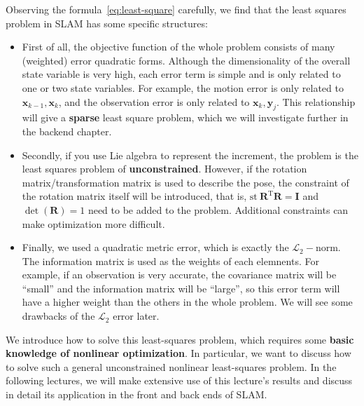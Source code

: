 Observing the formula~\eqref{eq:least-square} carefully, we find that the least squares problem in SLAM has some specific structures:

\begin{itemize}
	\item First of all, the objective function of the whole problem consists of many (weighted) error quadratic forms. Although the dimensionality of the overall state variable is very high, each error term is simple and is only related to one or two state variables. For example, the motion error is only related to $\bm{x}_{k-1}, \bm{x}_k$, and the observation error is only related to $\bm{x}_k, \bm{y}_j$. This relationship will give a \textbf{sparse} least square problem, which we will investigate further in the backend chapter.

	\item Secondly, if you use Lie algebra to represent the increment, the problem is the least squares problem of \textbf{unconstrained}. However, if the rotation matrix/transformation matrix is ​​used to describe the pose, the constraint of the rotation matrix itself will be introduced, that is, $\mathrm{st}\ \bm{R}^\mathrm{T} \bm{R} = \bm{I}$ and $\det (\bm{R})=1$ need to be added to the problem. Additional constraints can make optimization more difficult. 

	\item Finally, we used a quadratic metric error, which is exactly the $\mathcal{L}_2-$norm. The information matrix is used as the weights of each elemnents. For example, if an observation is very accurate, the covariance matrix will be ``small'' and the information matrix will be ``large'', so this error term will have a higher weight than the others in the whole problem. We will see some drawbacks of the $\mathcal{L}_2$ error later.
\end{itemize}

We introduce how to solve this least-squares problem, which requires some \textbf{basic knowledge of nonlinear optimization}. In particular, we want to discuss how to solve such a general unconstrained nonlinear least-squares problem. In the following lectures, we will make extensive use of this lecture's results and discuss in detail its application in the front and back ends of SLAM.

